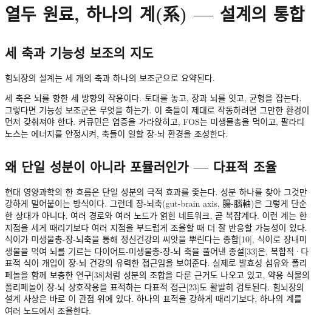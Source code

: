\documentclass[12pt,oneside]{book}
\begin{document}
\section{열두 원료, 하나의 계(系) — 설계의 통합}

\subsection{세 축과 기능성 보조의 지도}

힘뇌장의 설계는 세 개의 축과 하나의 보조군으로 요약된다.

\vspace{2pt}\vspace{3pt}

세 축은 뇌를 향한 세 방향의 작용이다. 토대를 놓고, 장과 뇌를 잇고, 균형을 잡는다. 그렇다면 기능성 보조군은 무엇을 하는가. 이 축들이 제대로 작동하려면 그만한 환경이 먼저 갖춰져야 한다. 커큐민은 염증을 가라앉히고, FOS는 미생물총을 먹이고, 팔라티노스는 에너지를 안정시켜, 축들이 일할 장-뇌 환경을 조성한다.

\subsection{왜 단일 성분이 아니라 포뮬러인가 — 다표적 조율}

현대 영양과학의 한 흐름은 단일 성분의 극적 효과를 좇는다. 성분 하나를 찾아 그것만 강하게 밀어붙이는 방식이다. 그런데 장-뇌축(gut-brain axis, 腸-腦軸)은 그렇게 단순한 상대가 아니다. 여러 경로와 여러 노드가 얽힌 네트워크, 곧 복잡계다. 이런 계는 한 지점을 세게 때리기보다 여러 지점을 부드럽게 조율할 때 더 잘 반응할 가능성이 있다. 식이가 미생물총-장-뇌축을 통해 정신건강의 씨앗을 뿌린다는 종합[10], 식이로 장내미생물을 먹여 뇌를 기르는 다이어트-미생물총-장-뇌 축을 풀어낸 종설[33]은, 복합적·다표적 식이 개입이 장-뇌 건강의 유력한 접근임을 보여준다. 실제로 발효성 섬유와 폴리페놀을 함께 보충한 연구[38]처럼 성분의 조합을 다룬 근거도 나오고 있고, 약용 식물의 폴리페놀이 장-뇌 상호작용을 표적하는 다표적 접근[23]도 활발히 검토된다. 힘뇌장의 설계 사상은 바로 이 관점 위에 있다. 하나의 표적을 강하게 때리기보다, 하나의 계를 여러 노드에서 조율한다.
\end{document}
